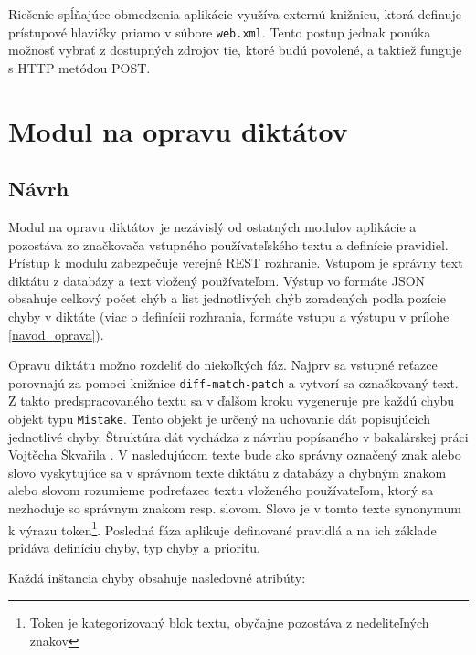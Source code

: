 \documentclass[12pt,oneside]{fithesis2}
\begin{document}
      		\par Riešenie spĺňajúce obmedzenia aplikácie využíva externú knižnicu\cite{dzhuvinov15}, ktorá definuje prístupové hlavičky priamo v súbore \texttt{web.xml}. Tento postup jednak ponúka možnosť vybrať z dostupných zdrojov tie, ktoré budú povolené, a taktiež funguje s HTTP metódou POST\cite{sof2}.
\pagebreak

      \section{Modul na opravu diktátov} \label{modul-diktaty}
      
      \subsection{Návrh}
      \par Modul na opravu diktátov je nezávislý od ostatných modulov aplikácie a pozostáva zo značkovača vstupného používateľského textu a definície pravidiel. Prístup k modulu zabezpečuje verejné REST rozhranie. Vstupom je správny text diktátu z databázy a text vložený používateľom. Výstup vo formáte JSON obsahuje celkový počet chýb a list jednotlivých chýb zoradených podľa pozície chyby v diktáte (viac o definícii rozhrania, formáte vstupu a výstupu v prílohe \ref{navod_oprava}). 
      \par Opravu diktátu možno rozdeliť do niekoľkých fáz. Najprv sa vstupné reťazce porovnajú za pomoci knižnice \texttt{diff-match-patch}\cite{diffmatchpatch} a vytvorí sa označkovaný text. Z takto predspracovaného textu sa v ďalšom kroku vygeneruje pre každú chybu objekt typu \texttt{Mistake}. Tento objekt je určený na uchovanie dát popisujúcich jednotlivé chyby. Štruktúra dát vychádza z návrhu popísaného v bakalárskej práci Vojtěcha Škvařila \cite{skvaril14}. V nasledujúcom texte bude ako správny označený znak alebo slovo vyskytujúce sa v správnom texte diktátu z databázy a chybným znakom alebo slovom rozumieme podreťazec textu vloženého používateľom, ktorý sa nezhoduje so správnym znakom resp. slovom. Slovo je v tomto texte synonymum k výrazu token\footnote{Token je kategorizovaný blok textu, obyčajne pozostáva z nedeliteľných znakov}. Posledná fáza aplikuje definované pravidlá a na ich základe pridáva definíciu chyby, typ chyby a prioritu.
\par Každá inštancia chyby obsahuje nasledovné atribúty:
\end{document}
